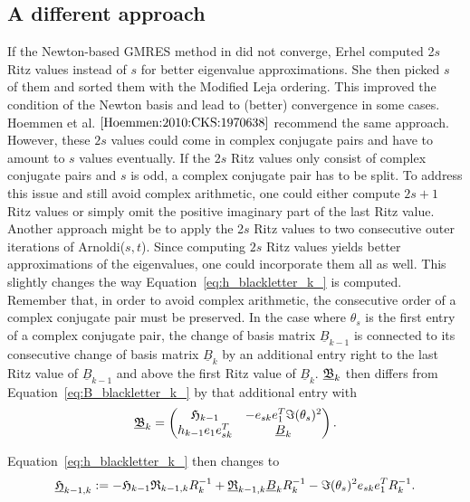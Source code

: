 \documentclass{scrartcl}
\numberwithin{equation}{section}
\begin{document}
\subsection{A different approach}
If the Newton-based GMRES method in \cite{Erhel95aparallel} did not converge, Erhel computed 2$s$ Ritz values instead of $s$ for better eigenvalue approximations. She then picked $s$ of them and sorted them with the Modified Leja ordering. This improved the condition of the Newton basis and lead to (better) convergence in some cases. Hoemmen et al. $\cite{Hoemmen:2010:CKS:1970638}$ recommend the same approach. However, these $2s$ values could come in complex conjugate pairs and have to amount to $s$ values eventually. If the $2s$ Ritz values only consist of complex conjugate pairs and $s$ is odd, a complex conjugate pair has to be split. To address this issue and still avoid complex arithmetic, one could either compute $2s + 1$ Ritz values or simply omit the positive imaginary part of the last Ritz value. Another approach might be to apply the 2$s$ Ritz values to two consecutive outer iterations of Arnoldi($s,t$). Since computing $2s$ Ritz values yields better approximations of the eigenvalues, one could incorporate them all as well. This slightly changes the way Equation~\eqref{eq:h_blackletter_k_} is computed. Remember that, in order to avoid complex arithmetic, the consecutive order of a complex conjugate pair must be preserved. In the case where $\theta_s$ is the first entry of a complex conjugate pair, the change of basis matrix $\underline{B}_{k - 1 }$ is connected to its consecutive change of basis matrix $\underline{B}_{k}$ by an additional entry right to the last Ritz value of $\underline{B}_{k - 1}$ and above the first Ritz value of $\underline{B}_k$. $\underline{\frak{B}}_k$ then differs from Equation~\eqref{eq:B_blackletter_k_} by that additional entry with
\begin{equation}
\underline{\frak{B}}_{k} = 
\begin{pmatrix}
	\frak{H}_{k - 1} & -e_{sk} e^T_1 \Im (\theta_s)^2 \\
	h_{k - 1} e_1 e^T_{sk} & \underline{B}_k
\end{pmatrix}.
\end{equation}

Equation~\eqref{eq:h_blackletter_k_} then changes to
\begin{equation}
\underline{\frak{H}}_{k - 1, k} := -\frak{H}_{k - 1} \frak{R}_{k - 1, k} R^{-1}_k + \underline{\frak{R}}_{k - 1, k} \underline{B}_k R^{-1}_k - \Im (\theta_s)^2 e_{sk} e^T_1  R^{-1}_{k}.
\end{equation}
\end{document}
